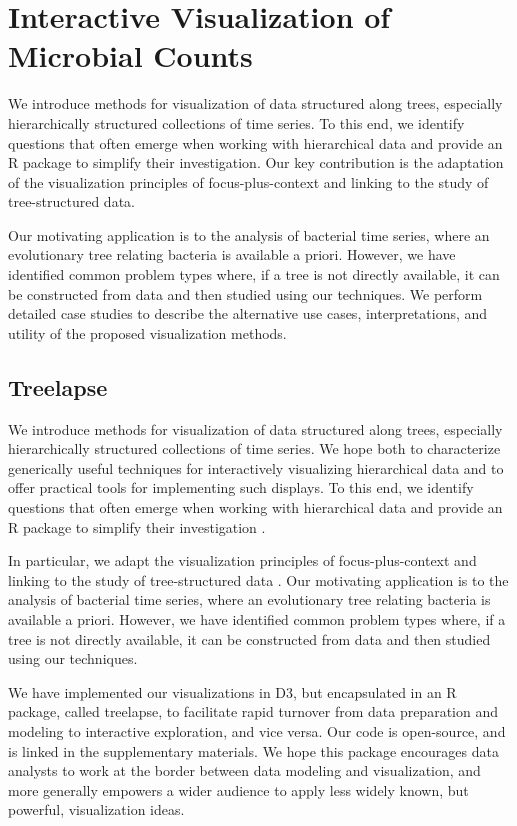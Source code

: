 \chapter{Interactive Visualization of Microbial Counts}
\label{ch:interactive_vis}

We introduce methods for visualization of data structured along trees,
especially hierarchically structured collections of time series. To this end, we
identify questions that often emerge when working with hierarchical data and
provide an R package to simplify their investigation. Our key contribution is
the adaptation of the visualization principles of focus-plus-context and linking
to the study of tree-structured data.

Our motivating application is to the analysis of bacterial time series, where an
evolutionary tree relating bacteria is available a priori. However, we have
identified common problem types where, if a tree is not directly available, it
can be constructed from data and then studied using our techniques. We perform
detailed case studies to describe the alternative use cases, interpretations,
and utility of the proposed visualization methods.


\section{Treelapse}\label{introduction}

We introduce methods for visualization of data structured along trees,
especially hierarchically structured collections of time series. We hope both to
characterize generically useful techniques for interactively visualizing
hierarchical data and to offer practical tools for implementing such displays.
To this end, we identify questions that often emerge when working with
hierarchical data and provide an R package to simplify their investigation
\citep{rlanguage}.

In particular, we adapt the visualization principles of focus-plus-context and
linking to the study of tree-structured data \citep{buja1996interactive,
  becker1987brushing}. Our motivating application is to the analysis of
bacterial time series, where an evolutionary tree relating bacteria is available
a priori. However, we have identified common problem types where, if a tree is
not directly available, it can be constructed from data and then studied using
our techniques.

We have implemented our visualizations in D3, but encapsulated in an R package,
called treelapse, to facilitate rapid turnover from data preparation and
modeling to interactive exploration, and vice versa. Our code is open-source,
and is linked in the supplementary materials. We hope this package encourages
data analysts to work at the border between data modeling and visualization, and
more generally empowers a wider audience to apply less widely known, but
powerful, visualization ideas.

